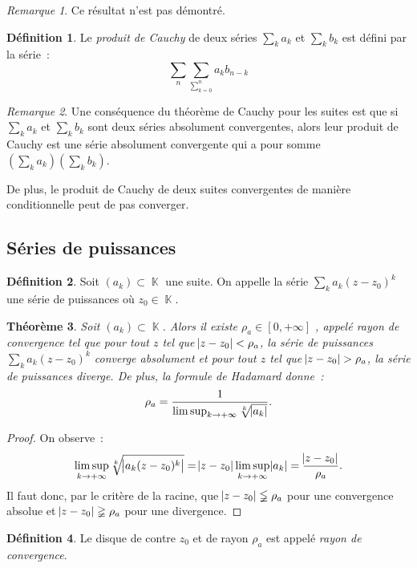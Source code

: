 \documentclass{article}
\DeclareMathOperator{\K}{\mathbb K}
\newtheorem{thm}{Théorème}[section]
\theoremstyle{definition}
\newtheorem{déf}[thm]{Définition}
\theoremstyle{remark}
\newtheorem*{rmq}{Remarque}
\begin{document}
		\begin{rmq} Ce résultat n'est pas démontré. \end{rmq}

		\begin{déf} Le \emph{produit de Cauchy} de deux séries $\sum_k a_k$ et $\sum_k b_k$ est défini par la série~:
		\[\sum_n\sum_{\sum_{k=0}^n}a_kb_{n-k}\]
		\end{déf}

		\begin{rmq} Une conséquence du théorème de Cauchy pour les suites est que si $\sum_k a_k$ et $\sum_k b_k$ sont deux séries absolument convergentes,
		alors leur produit de Cauchy est une série absolument convergente qui a pour somme $\left(\sum_k a_k\right)\left(\sum_k b_k\right)$.

		De plus, le produit de Cauchy de deux suites convergentes de manière conditionnelle peut de pas converger.
		\end{rmq}

	\subsection{Séries de puissances}
		\begin{déf} Soit $(a_k) \subset \K$ une suite. On appelle la série $\sum_k a_k(z-z_0)^k$ une série de puissances où $z_0 \in \K$.
		\end{déf}

		\begin{thm}\label{thm:rayondeconvergence} Soit $(a_k) \subset \K$. Alors il existe $\rho_a \in [0, +\infty]$ , appelé \emph{rayon de convergence} tel
		que pour tout $z$ tel que $\abs {z-z_0} < \rho_a$, la série de puissances $\sum_k a_k(z-z_0)^k$ converge absolument et pour tout $z$ tel que
		$\abs{z-z_0} > \rho_a$, la série de puissances diverge. De plus, la \emph{formule de Hadamard} donne~:
		\[\rho_a = \frac 1{\limsup_{k \to +\infty} \sqrt[k] {\abs{a_k}}}.\]
		\end{thm}

		\begin{proof} On observe~:
		\[\limsup_{k \to +\infty} \sqrt[k] {\abs{a_k(z-z_0)^k}} = \abs{z-z_0}\limsup_{k \to +\infty}\abs {a_k} = \frac {\abs {z-z_0}}{\rho_a}.\]
		Il faut donc, par le critère de la racine, que $\abs{z-z_0} \lneqq \rho_a$ pour une convergence absolue et $\abs{z-z_0} \gneqq \rho_a$ pour une
		divergence.
		\end{proof}

		\begin{déf} Le disque de contre $z_0$ et de rayon $\rho_a$ est appelé \emph{rayon de convergence}. \end{déf}
\end{document}
